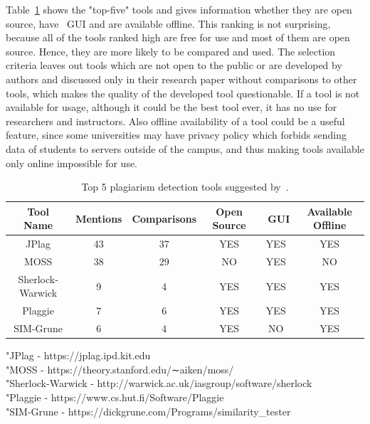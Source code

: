 \documentclass[12pt]{article}
\begin{document}
Table~\ref{table:toolsTable} shows the "top-five" tools and gives information whether they are open source, have ~\ac{GUI} and are available offline. This ranking is not surprising, because all of the tools ranked high are free for use and most of them are open source. Hence, they are more likely to be compared and used. The selection criteria leaves out tools which are not open to the public or are developed by authors and discussed only in their research paper without comparisons to other tools, which makes the quality of the developed tool questionable. If a tool is not available for usage, although it could be the best tool ever, it has no use for researchers and instructors. Also offline availability of a tool could be a useful feature, since some universities may have privacy policy which forbids sending data of students to servers outside of the campus, and thus making tools available only online impossible for use. 

\begin{table}[ht]
\centering
\begin{tabular}{|c c c c c c|} 
 \hline
 Tool Name &  Mentions & Comparisons & Open Source & ~\acs{GUI} & Available Offline \\ [0.5ex] 
\hline
 JPlag			& 43 & 37 & YES & YES & YES\\
 MOSS			& 38 & 29 &  NO & YES & NO\\
 Sherlock-Warwick&  9 &  4 & YES & YES & YES\\
 Plaggie		&  7 &  6 & YES & YES & YES\\
 SIM-Grune 		&  6 &  4 & YES &  NO & YES\\
\hline
\end{tabular}
\caption{Top 5 plagiarism detection tools suggested by~\cite{novak}.}
\label{table:toolsTable}
\footnotetext "JPlag - https://jplag.ipd.kit.edu\\
\footnotetext "MOSS - https://theory.stanford.edu/∼aiken/moss/\\
\footnotetext "Sherlock-Warwick - http://warwick.ac.uk/iasgroup/software/sherlock\\
\footnotetext "Plaggie - https://www.cs.hut.fi/Software/Plaggie\\
\footnotetext "SIM-Grune - https://dickgrune.com/Programs/similarity\_tester\\
\end{table}
\end{document}
